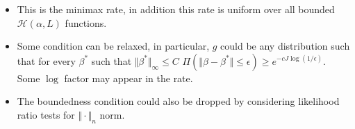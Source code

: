 \begin{itemize}
\item This is the minimax rate, in addition this rate is uniform over all bounded $\mathcal{H}(\alpha,L)$ functions. 
\item Some condition can be relaxed, in particular, $g$ could be any distribution such that for every $\beta^*$ such that $\Vert \beta^*\Vert_\infty \leq C$ $\Pi(\Vert \beta - \beta^* \Vert \leq \epsilon) \geq e^{-c J \log(1/\epsilon)}$. Some $\log$ factor may appear in the rate.
\item The boundedness condition could also be dropped by considering likelihood ratio tests for $\Vert \cdot \Vert_n$ norm. 
\end{itemize}

